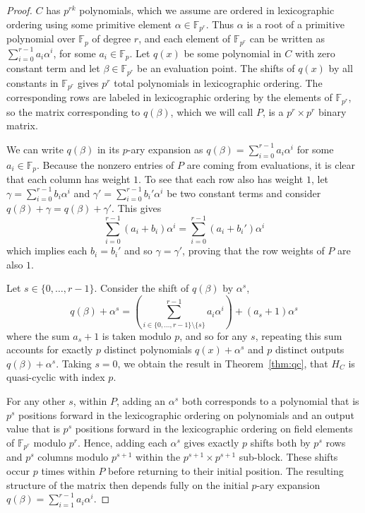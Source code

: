 \documentclass[11pt]{amsart}
\theoremstyle{definition}
\newcommand{\0}{\mathbf{0}}
\newcommand{\F}{\mathbb{F}}
\begin{document}
\begin{proof}
    $C$ has $p^{rk}$ polynomials, which we assume are ordered in lexicographic ordering using some primitive element $\alpha \in \F_{p^r}$. Thus $\alpha$ is a root of a primitive polynomial over $\mathbb{F}_p$ of degree $r$, and each element of $\mathbb{F}_{p^r}$ can be written as $\sum_{i=0}^{r-1} a_i\alpha^i$, for some $a_i\in \mathbb{F}_p$. Let $q(x)$ be some polynomial in $C$ with zero constant term and let $\beta \in \F_{p^r}$ be an evaluation point. The shifts of $q(x)$ by all constants in $\F_{p^r}$ gives $p^r$ total polynomials in lexicographic ordering. The corresponding rows are labeled in lexicographic ordering by the elements of $\F_{p^r}$, so the matrix corresponding to $q(\beta)$, which we will call $P$, is a $p^r \times p^r$ binary matrix.

    We can write $q(\beta)$ in its $p$-ary expansion as $q(\beta)= \sum_{i=0}^{r-1} a_i \alpha^i$ for some $a_i \in \F_p$. Because the nonzero entries of $P$ are coming from evaluations, it is clear that each column has weight $1$. To see that each row also has weight $1$, let $\gamma = \sum_{i=0}^{r-1} b_i \alpha^i$ and $\gamma' = \sum_{i=0}^{r-1} b_i' \alpha^i$ be two constant terms and consider $q(\beta) + \gamma = q(\beta) + \gamma'$. This gives 
    \[\sum_{i=0}^{r-1} (a_i + b_i)\alpha^i = \sum_{i=0}^{r-1} (a_i + b_i')\alpha^i\]
    which implies each $b_i = b_i'$ and so $\gamma = \gamma'$, proving that the row weights of $P$ are also $1$. 

    Let $s \in \{0, \dotsc, r-1\}$. Consider the shift of $q(\beta)$ by $\alpha^s$, 
    \[q(\beta) + \alpha^s =  \left( \sum_{i \in \{0, \dotsc, r-1\} \setminus \{s\}}^{r-1} a_i \alpha^i \right) + (a_s+1)\alpha^s\]
    where the sum $a_s+1$ is taken modulo $p$, and so for any $s$, repeating this sum accounts for exactly $p$ distinct polynomials $q(x) + \alpha^s$ and $p$ distinct outputs $q(\beta) + \alpha^s$. Taking $s=0$, we obtain the result in Theorem~\ref{thm:qc}, that $H_C$ is quasi-cyclic with index $p$.

    For any other $s$, within $P$, adding an $\alpha^s$ both corresponds to a polynomial that is $p^s$ positions forward in the lexicographic ordering on polynomials and an output value that is $p^s$ positions forward in the lexicographic ordering on field elements of $\F_{p^r}$ modulo $p^r$. Hence, adding each $\alpha^s$ gives exactly $p$ shifts both by $p^s$ rows and $p^s$ columns modulo $p^{s+1}$ within the $p^{s+1} \times p^{s+1}$ sub-block. These shifts occur $p$ times within $P$ before returning to their initial position. The resulting structure of the matrix then depends fully on the initial $p$-ary expansion $q(\beta)=\sum_{i=1}^{r-1} a_i\alpha^i$.


\end{proof}
\end{document}
